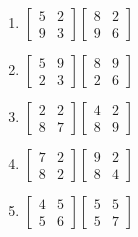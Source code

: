 \documentclass[20pt]{extarticle}
\begin{document}
\begin{minipage}{0.7\linewidth}
\begin{multicols}{3}
\begin{enumerate}
                \item \(\begin{bmatrix}
                        5 & 2\\
                        9 & 3
                    \end{bmatrix}\begin{bmatrix}
                        8 & 2\\
                        9 & 6
                    \end{bmatrix}\)
                \item \(\begin{bmatrix}
                        5 & 9\\
                        2 & 3
                    \end{bmatrix}\begin{bmatrix}
                        8 & 9\\
                        2 & 6
                    \end{bmatrix}\)
                \item \(\begin{bmatrix}
                        2 & 2\\
                        8 & 7
                    \end{bmatrix}\begin{bmatrix}
                        4 & 2\\
                        8 & 9
                    \end{bmatrix}\)
                \item \(\begin{bmatrix}
                        7 & 2\\
                        8 & 2
                    \end{bmatrix}\begin{bmatrix}
                        9 & 2\\
                        8 & 4
                    \end{bmatrix}\)
                \item \(\begin{bmatrix}
                        4 & 5\\
                        5 & 6
                    \end{bmatrix}\begin{bmatrix}
                        5 & 5\\
                        5 & 7
                    \end{bmatrix}\)

\end{enumerate}
\end{multicols}
\end{minipage}
\end{document}
